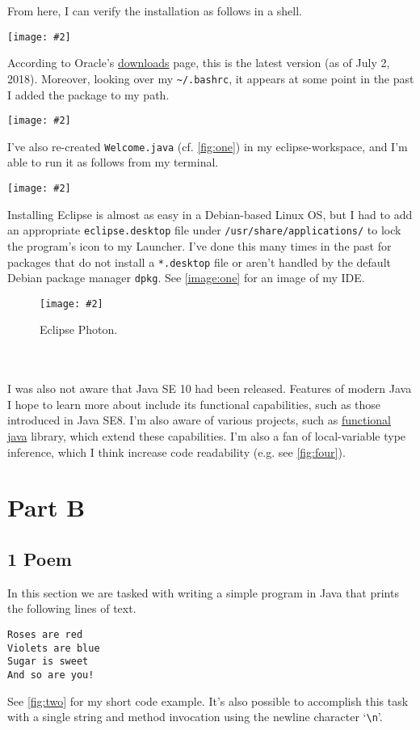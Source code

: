 \documentclass[leqno, 11pt]{article}
\newcommand{\centeredimage}[2]{%
  \begin{center}
    \texttt{[image: \#2]}
  \end{center}
}
\begin{document}
From here, I can verify the installation as follows in a shell.
\centeredimage{0.6}{photos/jdk.png}
According to Oracle's \href{http://www.oracle.com/technetwork/java/javase/downloads/index.html}{downloads} page, this is the latest version (as of July 2, 2018). Moreover, looking over my \texttt{\textasciitilde/.bashrc}, it appears at some point in the past I added the package to my path.
\centeredimage{0.6}{photos/path.png}
I've also re-created \texttt{Welcome.java} (cf. \autoref{fig:one}) in my eclipse-workspace, and I'm able to run it as follows from my terminal.
\centeredimage{0.6}{photos/first_program.png}
Installing Eclipse is almost as easy in a Debian-based Linux OS, but I had to add an appropriate \texttt{eclipse.desktop} file under \texttt{/usr/share/applications/} to lock the program's icon to my Launcher. I've done this many times in the past for packages that do not install a \texttt{*.desktop} file or aren't handled by the default Debian package manager \texttt{dpkg}. See \autoref{image:one} for an image of my IDE.
\begin{figure}[ht!]
  \centeredimage{0.34}{photos/ide.png}
  \caption{Eclipse Photon.}
  \label{image:one}
\end{figure}\\\\
I was also not aware that Java SE 10 had been released. Features of modern Java I hope to learn more about include its functional capabilities, such as those introduced in Java SE8. I'm also aware of various projects, such as \href{https://github.com/functionaljava/functionaljava}{functional java} library, which extend these capabilities. I'm also a fan of local-variable type inference, which I think increase code readability (e.g. see \autoref{fig:four}).
\section*{Part B}
\subsection*{1 Poem} %
In this section we are tasked with writing a simple program in Java that prints the
following lines of text.
\begin{verbatim}
Roses are red
Violets are blue
Sugar is sweet
And so are you!
\end{verbatim}
See \autoref{fig:two} for my short code example. It's also possible to accomplish this task with a single string and method invocation using the newline character `\texttt{\textbackslash n}'.
\end{document}

